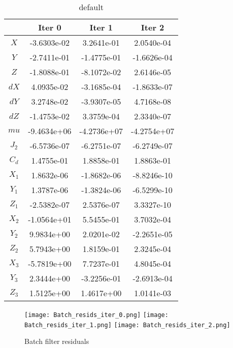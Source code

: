 \documentclass[10pt]{article}
\begin{document}
\begin{table}[htdp]
\caption{default}
\begin{center}
\begin{tabular}{|c|c|c|c|}
\hline
 & Iter 0 &  Iter 1 &  Iter 2 \\ 
 \hline\hline
$X  $ &  -3.6303e-02 &  3.2641e-01 &  2.0540e-04 \\ 
$Y  $ &  -2.7411e-01 & -1.4775e-01 & -1.6626e-04 \\ 
$Z  $ &  -1.8088e-01 & -8.1072e-02 &  2.6146e-05 \\ 
$dX $ &   4.0935e-02 & -3.1685e-04 & -1.8633e-07 \\ 
$dY $ &   3.2748e-02 & -3.9307e-05 &  4.7168e-08 \\ 
$dZ $ &  -1.4753e-02 &  3.3759e-04 &  2.3340e-07 \\ 
$mu $ &  -9.4634e+06 & -4.2736e+07 & -4.2754e+07 \\ 
$J_2$ &  -6.5736e-07 & -6.2751e-07 & -6.2749e-07 \\ 
$C_d$ &   1.4755e-01 &  1.8858e-01 &  1.8863e-01 \\ 
$X_1$ &   1.8632e-06 & -1.8682e-06 & -8.8246e-10 \\ 
$Y_1$ &   1.3787e-06 & -1.3824e-06 & -6.5299e-10 \\ 
$Z_1$ &  -2.5382e-07 &  2.5376e-07 &  3.3327e-10 \\ 
$X_2$ &  -1.0564e+01 &  5.5455e-01 &  3.7032e-04 \\ 
$Y_2$ &   9.9834e+00 &  2.0201e-02 & -2.2651e-05 \\ 
$Z_2$ &   5.7943e+00 &  1.8159e-01 &  2.3245e-04 \\ 
$X_3$ &  -5.7819e+00 &  7.7237e-01 &  4.8045e-04 \\ 
$Y_3$ &   2.3444e+00 & -3.2256e-01 & -2.6913e-04 \\ 
$Z_3$ &   1.5125e+00 &  1.4617e+00 &  1.0141e-03 \\ 
\hline
\end{tabular}
\end{center}
\label{default}
\end{table}%

\begin{figure}[htbp]
\begin{center}
\texttt{[image: Batch\_resids\_iter\_0.png]}
\texttt{[image: Batch\_resids\_iter\_1.png]}
\texttt{[image: Batch\_resids\_iter\_2.png]}
\caption{Batch filter residuals}
\end{center}
\end{figure}
\end{document}
